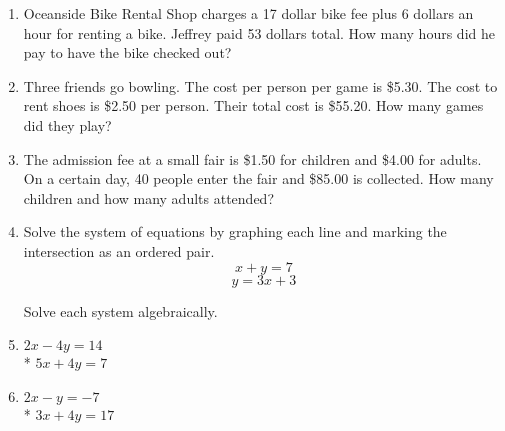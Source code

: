 \documentclass[12pt, twoside]{article}
\begin{document}
\begin{enumerate}
     
  
  \newpage
    \item Oceanside Bike Rental Shop charges a 17 dollar bike fee plus 6 dollars an hour for renting a bike. Jeffrey paid 53 dollars total. How many hours did he pay to have the bike checked out? \vspace{6cm}
  
    \item Three friends go bowling. The cost per person per game is \$5.30. The cost to rent shoes is \$2.50 per person. Their total cost is \$55.20. How many games did they play? \vspace{6cm}
  
    \item The admission fee at a small fair is \$1.50 for children and \$4.00 for adults. On a certain day, 40 people enter the fair and \$85.00 is collected. How many children and how many adults attended?
  
\newpage
\item Solve the system of equations by graphing each line and marking the intersection as an ordered pair.
      \[x+y=7\]
      \[y=3x+3\]
  
  \begin{center} %
  \end{center}
  
  \newpage
    Solve each system algebraically.
    \item
    $2x-4y=14$\\*
    $5x+4y=7$ \vspace{6cm}
  
    \item
    $2x-y=-7$\\*
    $3x+4y=17$  \vspace{6cm}
      
      

\end{enumerate}
\end{document}
